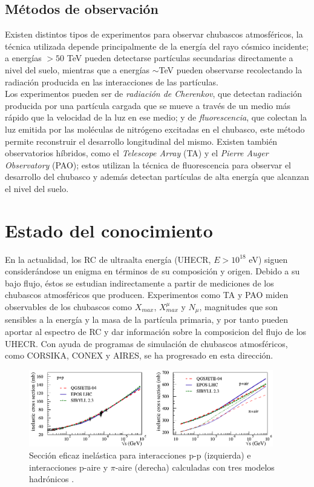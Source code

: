 	\subsection{Métodos de observación}
	Existen distintos tipos de experimentos para observar chubascos atmosféricos, la técnica utilizada depende principalmente de la energía del rayo cósmico incidente; a energías $>50$ TeV pueden detectarse partículas secundarias directamente a nivel del suelo, mientras que a energías $\sim$TeV pueden observarse recolectando la radiación producida en las interacciones de las partículas. \\
	
	Los experimentos pueden ser de \textit{radiación de Cherenkov}, que detectan radiación producida por una partícula cargada que se mueve a través de un medio más rápido que la velocidad de la luz en ese medio; y de \textit{fluorescencia}, que colectan la luz emitida por las moléculas de nitrógeno excitadas en el chubasco, este método permite reconstruir el desarrollo longitudinal del mismo. Existen también observatorios híbridos, como el \textit{Telescope Array} (TA) y el \textit{Pierre Auger Observatory} (PAO); estos utilizan la técnica de fluorescencia para observar el desarrollo del chubasco y además detectan partículas de alta energía que alcanzan el nivel del suelo.
	
\section{Estado del conocimiento}
En la actualidad, los RC de ultraalta energía (UHECR, $E > 10^{18}$ eV) siguen considerándose un enigma en términos de su composición y origen. Debido a su bajo flujo, éstos se estudian indirectamente a partir de mediciones de los chubascos atmosféricos que producen. Experimentos como TA y PAO miden observables de los chubascos como $X_{max}$, $X_{max}^{\mu}$ y $N_{\mu}$, magnitudes que son sensibles a la energía y la masa de la partícula primaria, y por tanto pueden aportar al espectro de RC y dar información sobre la composicion del flujo de los UHECR. Con ayuda de programas de simulación de chubascos atmosféricos, como CORSIKA, CONEX y AIRES, se ha progresado en esta dirección.\\

\begin{figure}[h]
\centering
\includegraphics[width=0.95\textwidth]{Figuras/Pierog2018} 
\caption{Sección eficaz inelástica para interacciones p-p (izquierda) e interacciones p-aire y $\pi$-aire (derecha) calculadas con tres modelos hadrónicos \cite{Pierog2018}.}
\label{fig:cross_sections}
\end{figure}	

